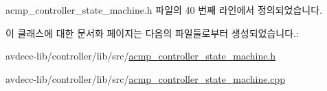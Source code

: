 acmp\+\_\+controller\+\_\+state\+\_\+machine.\+h 파일의 40 번째 라인에서 정의되었습니다.



이 클래스에 대한 문서화 페이지는 다음의 파일들로부터 생성되었습니다.\+:\begin{DoxyCompactItemize}
\item 
avdecc-\/lib/controller/lib/src/\hyperlink{acmp__controller__state__machine_8h}{acmp\+\_\+controller\+\_\+state\+\_\+machine.\+h}\item 
avdecc-\/lib/controller/lib/src/\hyperlink{acmp__controller__state__machine_8cpp}{acmp\+\_\+controller\+\_\+state\+\_\+machine.\+cpp}\end{DoxyCompactItemize}
